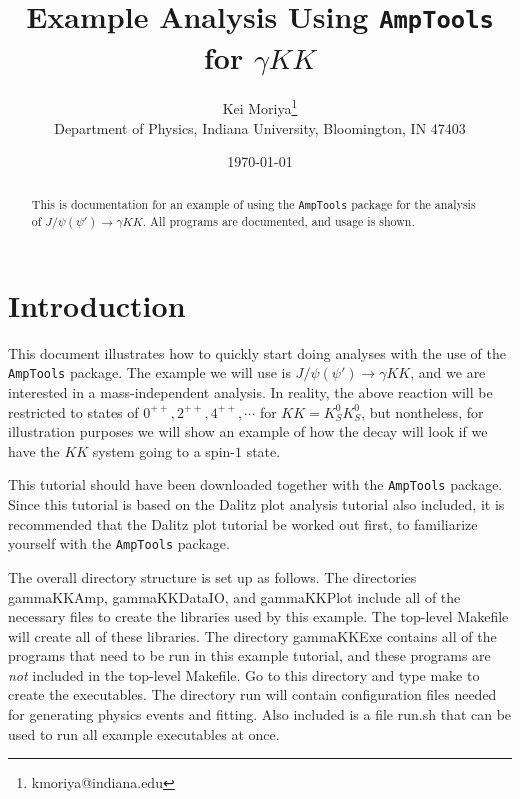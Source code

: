 \documentclass[11pt]{article}
\newcommand{\AmpTools}{{\tt{AmpTools}}}
\begin{document}

\title{Example Analysis Using \AmpTools{} for $\gamma KK$}
\author{Kei Moriya\footnote{kmoriya@indiana.edu} \\
  Department of Physics, Indiana University, Bloomington, IN 47403}
\date{\today}

\maketitle

\begin{abstract}
This is documentation for an example of using the \AmpTools{} package
for the analysis of $J/\psi (\psi') \to \gamma KK$. All programs are
documented, and usage is shown.
\end{abstract}

\section{Introduction}

This document illustrates how to quickly start doing analyses with the
use of the \AmpTools{} package. The example we will use is $J/\psi
(\psi') \to \gamma K K$, and we are interested in a mass-independent
analysis. In reality, the above reaction will be restricted to states
of $0^{++}, 2^{++}, 4^{++}, \cdots$ for $KK = K_{S}^{0} K_{S}^{0}$,
but nontheless, for illustration purposes we will show an example of
how the decay will look if we have the $KK$ system going to a spin-$1$
state.

This tutorial should have been downloaded together with the
\AmpTools{} package. Since this tutorial is based on the Dalitz plot
analysis tutorial also included, it is recommended that the Dalitz
plot tutorial be worked out first, to familiarize yourself
with the \AmpTools{} package.

The overall directory structure is set up as follows. The directories
gammaKKAmp, gammaKKDataIO, and gammaKKPlot include all of the
necessary files to create the libraries used by this example. The
top-level Makefile will create all of these libraries. The directory
gammaKKExe contains all of the programs that need to be run in this
example tutorial, and these programs are \textit{not} included in the
top-level Makefile. Go to this directory and type make to create the
executables. The directory run will contain configuration files needed
for generating physics events and fitting. Also included is a file
run.sh that can be used to run all example executables at once.
\end{document}
